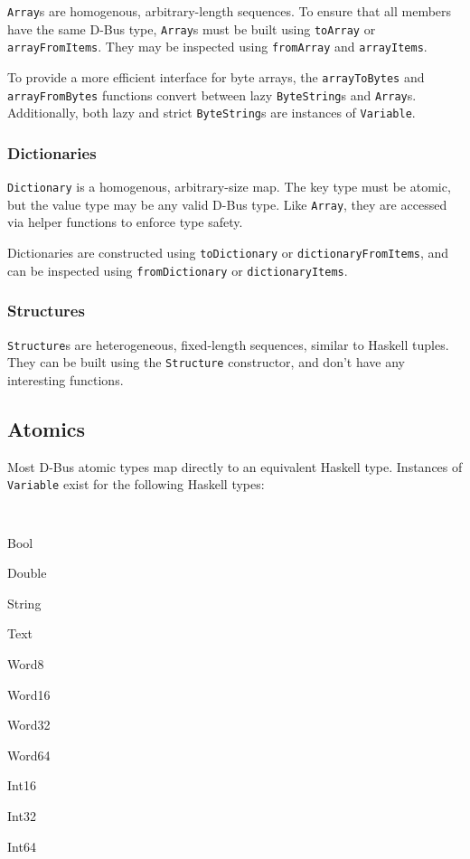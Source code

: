 \documentclass[12pt]{article}
\begin{document}
{\tt Array}s are homogenous, arbitrary-length sequences. To ensure that
all members have the same D-Bus type, {\tt Array}s must be built using
{\tt toArray} or {\tt arrayFromItems}. They may be inspected using
{\tt fromArray} and {\tt arrayItems}.

To provide a more efficient interface for byte arrays, the {\tt arrayToBytes}
and {\tt arrayFromBytes} functions convert between lazy {\tt ByteString}s
and {\tt Array}s. Additionally, both lazy and strict {\tt ByteString}s are
instances of {\tt Variable}.

\subsubsection{Dictionaries}

{\tt Dictionary} is a homogenous, arbitrary-size map. The key type must
be atomic, but the value type may be any valid D-Bus type. Like {\tt Array},
they are accessed via helper functions to enforce type safety.

Dictionaries are constructed using {\tt toDictionary} or
{\tt dictionaryFromItems}, and can be inspected using {\tt fromDictionary}
or {\tt dictionaryItems}.

\subsubsection{Structures}

{\tt Structure}s are heterogeneous, fixed-length sequences, similar to
Haskell tuples. They can be built using the {\tt Structure} constructor, and
don't have any interesting functions.

\subsection{Atomics}

Most D-Bus atomic types map directly to an equivalent Haskell type.
Instances of {\tt Variable} exist for the following Haskell types:

\begin{multicols}{3}
\begin{itemize}{\tt 
\item Bool
\item Double
\item String
\item Text
\item Word8
\item Word16
\item Word32
\item Word64
\item Int16
\item Int32
\item Int64
}
\end{itemize}
\end{multicols}
\end{document}
